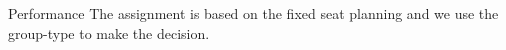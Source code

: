 

  \begin{frame}{Performance}
    \scriptsize
    The assignment is based on the fixed seat planning and we use the group-type to make the decision. 


\end{frame}
